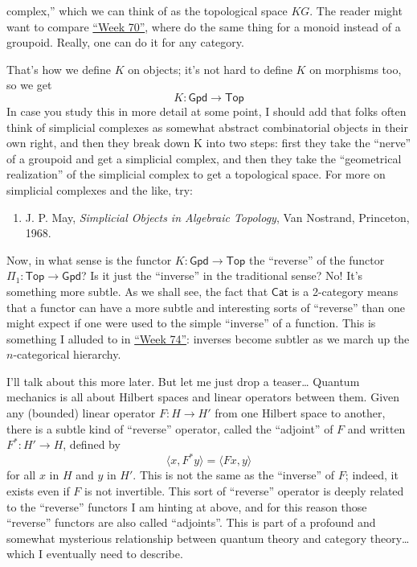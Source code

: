 \documentclass{article}
\def\tightlist{}
\begin{document}
complex,'' which we can think of as the topological space \(KG\). The
reader might want to compare \protect\hyperlink{week70}{``Week 70''},
where do the same thing for a monoid instead of a groupoid. Really, one
can do it for any category.

That's how we define \(K\) on objects; it's not hard to define \(K\) on
morphisms too, so we get \[K\colon\mathsf{Gpd}\to\mathsf{Top}\] In case
you study this in more detail at some point, I should add that folks
often think of simplicial complexes as somewhat abstract combinatorial
objects in their own right, and then they break down K into two steps:
first they take the ``nerve'' of a groupoid and get a simplicial
complex, and then they take the ``geometrical realization'' of the
simplicial complex to get a topological space. For more on simplicial
complexes and the like, try:

\begin{enumerate}
\def\labelenumi{\arabic{enumi})}
\tightlist
\item
  J. P. May, \emph{Simplicial Objects in Algebraic Topology}, Van
  Nostrand, Princeton, 1968.
\end{enumerate}

Now, in what sense is the functor \(K\colon\mathsf{Gpd}\to\mathsf{Top}\)
the ``reverse'' of the functor
\(\Pi_1\colon\mathsf{Top}\to\mathsf{Gpd}\)? Is it just the ``inverse''
in the traditional sense? No! It's something more subtle. As we shall
see, the fact that \(\mathsf{Cat}\) is a 2-category means that a functor
can have a more subtle and interesting sorts of ``reverse'' than one
might expect if one were used to the simple ``inverse'' of a function.
This is something I alluded to in \protect\hyperlink{week74}{``Week
74''}: inverses become subtler as we march up the \(n\)-categorical
hierarchy.

I'll talk about this more later. But let me just drop a teaser\ldots{}
Quantum mechanics is all about Hilbert spaces and linear operators
between them. Given any (bounded) linear operator \(F\colon H\to H'\)
from one Hilbert space to another, there is a subtle kind of ``reverse''
operator, called the ``adjoint'' of \(F\) and written
\(F^*\colon H'\to H\), defined by
\[\langle x,F^*y \rangle = \langle Fx,y \rangle\] for all \(x\) in \(H\)
and \(y\) in \(H'\). This is not the same as the ``inverse'' of \(F\);
indeed, it exists even if \(F\) is not invertible. This sort of
``reverse'' operator is deeply related to the ``reverse'' functors I am
hinting at above, and for this reason those ``reverse'' functors are
also called ``adjoints''. This is part of a profound and somewhat
mysterious relationship between quantum theory and category
theory\ldots{} which I eventually need to describe.
\end{document}
